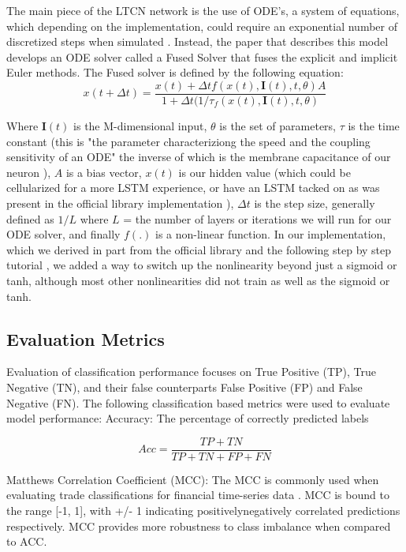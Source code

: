 \documentclass[10pt,twocolumn,letterpaper]{article}
\begin{document}
        The main piece of the LTCN network is the use of ODE's, a system of equations, which depending on the implementation, could require an exponential number of discretized steps when simulated \cite{hasani_liquid_2020}. Instead, the paper that describes this model develops an ODE solver called a Fused Solver that fuses the explicit and implicit Euler methods. The Fused solver is defined by the following equation:
\begin{equation}
    x(t + \Delta t) = \frac{x(t) + \Delta t f(x(t), \textbf{I}(t), t, \theta)A}{1 + \Delta t(1/\tau _ f(x(t), \textbf{I}(t), t, \theta)}
\end{equation}

        Where $\textbf{I}(t)$ is the M-dimensional input, $\theta$ is the set of parameters, $\tau$
        is the time constant (this is "the parameter characteriziong the speed and the coupling sensitivity of an ODE" \cite{hasani_liquid_2020} the inverse of which is the membrane capacitance of our neuron \cite{LNN_Tutorial}), $A$ is a bias vector, $x(t)$ is our hidden value (which could be cellularized for a more LSTM experience, or have an LSTM tacked on as was present in the official library implementation \cite{NCP_Github}), $\Delta t$ is the step size, generally defined as $1 / L$ where $L$ = the number of layers or iterations we will run for our ODE solver, and finally $f(.)$ is a non-linear function. In our implementation, which we derived in part from the official library \cite{NCP_Github} and the following step by step tutorial \cite{LNN_Tutorial}, we added a way to switch up the nonlinearity beyond just a sigmoid or tanh, although most other nonlinearities did not train as well as the sigmoid or tanh.

\subsection{Evaluation Metrics}
Evaluation of classification performance focuses on True Positive (TP), True Negative (TN), and their false counterparts False Positive (FP) and False Negative (FN). The following classification based metrics were used to evaluate model performance:
Accuracy: The percentage of correctly predicted labels
 
\begin{equation} \label{eq:accuracy}
    Acc = \frac{TP + TN}{TP + TN + FP + FN}
\end{equation}

Matthews Correlation Coefficient (MCC): The MCC is commonly used when evaluating trade classifications for financial time-series data \cite{STT_Paper,STLAT_sota,zou_survey}. MCC is bound to the range [-1, 1], with +/- 1 indicating positively\/negatively correlated predictions respectively. MCC provides more robustness to class imbalance when compared to ACC.
\end{document}
